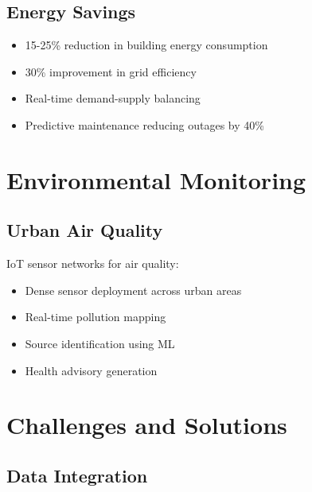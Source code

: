 \documentclass[12pt,a4paper]{article}
\begin{document}
\subsection{Energy Savings}

\begin{tcolorbox}[colback=urbangreen!10, colframe=urbangreen, title=Energy Management Results]
\begin{itemize}
    \item 15-25\% reduction in building energy consumption
    \item 30\% improvement in grid efficiency
    \item Real-time demand-supply balancing
    \item Predictive maintenance reducing outages by 40\%
\end{itemize}
\end{tcolorbox}

\section{Environmental Monitoring}

\subsection{Urban Air Quality}

IoT sensor networks for air quality:
\begin{itemize}
    \item Dense sensor deployment across urban areas
    \item Real-time pollution mapping
    \item Source identification using ML
    \item Health advisory generation
\end{itemize}

\section{Challenges and Solutions}

\subsection{Data Integration}
\end{document}
